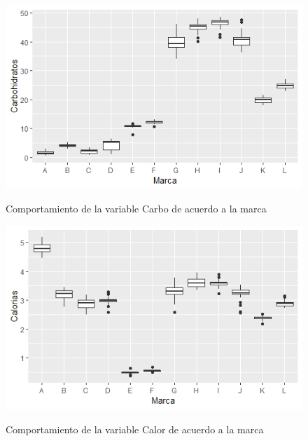 \documentclass[pdf]{beamer}
\begin{document}
\begin{frame}
\begin{figure}[h]
\centering
\includegraphics[scale=.65]{images/carbo.png} 
\label{i8}
\caption{Comportamiento de la variable Carbo de acuerdo a la marca}
\end{figure}
\end{frame}


\begin{frame}
\begin{figure}[h]
\centering
\includegraphics[scale=.65]{images/calor.png} 
\label{i9}
\caption{Comportamiento de la variable Calor de acuerdo a la marca}
\end{figure}
\end{frame}
\end{document}
